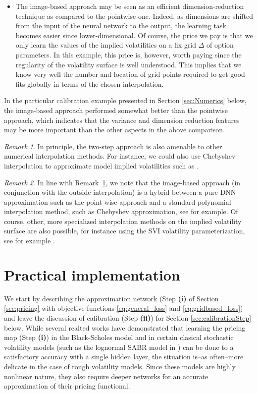 \documentclass{article}
\theoremstyle{remark}
\newtheorem{remark}{Remark}
\begin{document}
\begin{itemize}
\item The image-based approach may be seen as an efficient dimension-reduction
technique as compared to the pointwise one. Indeed, as dimensions are shifted
from the input of the neural network to the output, the learning task becomes
easier since lower-dimensional. Of course, the price we pay is that we only
learn the values of the implied volatilities on a fix grid $\Delta$ of option
parameters. In this example, this price is, however, worth paying since the
regularity of the volatility surface is well understood. This implies that we
know very well the number and location of grid points required to get good
fits globally in terms of the chosen interpolation.
\end{itemize}

In the particular calibration example presented in Section \ref{sec:Numerics} below, the image-based
approach performed somewhat better than the pointwise approach, which indicates
that the variance and dimension reduction features may be more important than
the other aspects in the above comparison.

\begin{remark}
  \label{rem:chebyshev}
  In principle, the two-step approach is also amenable to other numerical
  interpolation methods. For instance, we could also use Chebyshev
  interpolation to approximate model implied volatilities such as \cite{Glau19}.
\end{remark}
\begin{remark}
  \label{rem:chebyshev-2}
  In line with Remark~\ref{rem:chebyshev}, we note that the image-based
  approach (in conjunction with the outside interpolation) is a hybrid between
  a pure DNN approximation such as the point-wise approach and a standard
  polynomial interpolation method, such as Chebyshev approximation, see
  \cite{Glau19} for example. Of course, other, more specialized interpolation
  methods on the implied volatility surface are also possible, for instance
  using the SVI volatility parameterization, see for example \cite{Itkin14}.
\end{remark}



\section{Practical implementation}
\label{sec:implementation}
We start by describing the approximation network (Step \textbf{(i)} of Section \ref{sec:pricing}  with objective functions \eqref{eq:general_loss} and \eqref{eq:gridbased_loss}) and leave the discussion of calibration (Step \textbf{(ii)}) for Section \ref{sec:calibrationStep} below.
While several realted works \cite{Hutchison94, CulcinDas17, McGhee} have demonstrated that learning the pricing map (Step \textbf{(i)}) in the Black-Scholes model and in certain clasical stochastic volatility models (such as the lognormal SABR model in \cite{McGhee}) can be done to a satisfactory accuracy with a single hidden layer, the situation is--as often--more delicate in the case of rough volatility models. Since these models are highly nonlinear nature, they also require deeper networks for an accurate approximation of their pricing functional.
\end{document}
